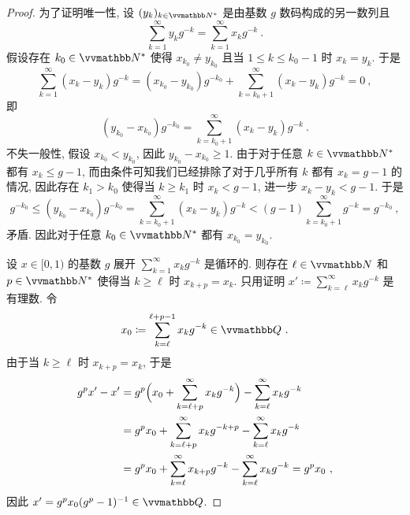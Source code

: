 \begin{proof}
    为了证明唯一性, 设 \((y_k)_{k \in \N^\ast}\) 是由基数 \(g\) 数码构成的另一数列且
    \[
        \sum_{k = 1}^\infty y_k g^{- k} = \sum_{k = 1}^\infty x_k g^{- k}\ .
    \]
    假设存在 \(k_0 \in \N^\ast\) 使得 \(x_{k_0} \neq y_{k_0}\) 且当 \(1 \leq k \leq k_0 - 1\) 时 \(x_k = y_k\). 于是
    \[
        \sum_{k = 1}^\infty (x_k - y_k) g^{- k} = (x_{k_0} - y_{k_0}) g^{- k_0} + \sum_{k = k_0 + 1}^\infty (x_k - y_k) g^{- k} = 0\ ,
    \]
    即
    \[
        (y_{k_0} - x_{k_0}) g^{- k_0} = \sum_{k = k_0 + 1}^\infty (x_k - y_k) g^{- k}\ .
    \]
    不失一般性, 假设 \(x_{k_0} < y_{k_0}\), 因此 \(y_{k_0} - x_{k_0} \geq 1\). 由于对于任意 \(k \in \N^\ast\) 都有 \(x_k \leq g - 1\), 而由条件可知我们已经排除了对于几乎所有 \(k\) 都有 \(x_k = g - 1\) 的情况, 因此存在 \(k_1 > k_0\) 使得当 \(k \geq k_1\) 时 \(x_k < g - 1\), 进一步 \(x_k - y_k < g - 1\). 于是
    \[
        g^{- k_0} \leq (y_{k_0} - x_{k_0}) g^{- k_0} = \sum_{k = k_0 + 1}^\infty (x_k - y_k) g^{- k} < (g - 1) \sum_{k = k_0 + 1}^\infty g^{- k} = g^{- k_0}\ ,
    \]
    矛盾. 因此对于任意 \(k_0 \in \N^\ast\) 都有 \(x_{k_0} = y_{k_0}\).

    设 \(x \in [0, 1)\) 的基数 \(g\) 展开 \(\sum_{k = 1}^\infty x_k g^{- k}\) 是循环的. 则存在 \(\ell \in \N\) 和 \(p \in \N^\ast\) 使得当 \(k \geq \ell\) 时 \(x_{k + p} = x_k\). 只用证明 \(x' \coloneqq \sum_{k = \ell}^\infty x_k g^{- k}\) 是有理数. 令
    \[
        x_0 \coloneqq \sum_{k = \ell}^{\ell + p - 1} x_k g^{- k} \in \Q\ .
    \]
    由于当 \(k \geq \ell\) 时 \(x_{k + p} = x_k\), 于是
    \begin{align*}
        g^p x' - x' &= g^p \Bigl(x_0 + \sum_{k = \ell + p}^\infty x_k g^{- k}\Bigr) - \sum_{k = \ell}^\infty x_k g^{- k}\\
        &= g^p x_0 + \sum_{k = \ell + p}^\infty x_k g^{- k + p} - \sum_{k = \ell}^\infty x_k g^{- k}\\
        &= g^p x_0 + \sum_{k = \ell}^\infty x_{k + p} g^{- k} - \sum_{k = \ell}^\infty x_k g^{- k} = g^p x_0\ ,
    \end{align*}
    因此 \(x' = g^p x_0 (g^p - 1)^{- 1} \in \Q\).


\end{proof}
